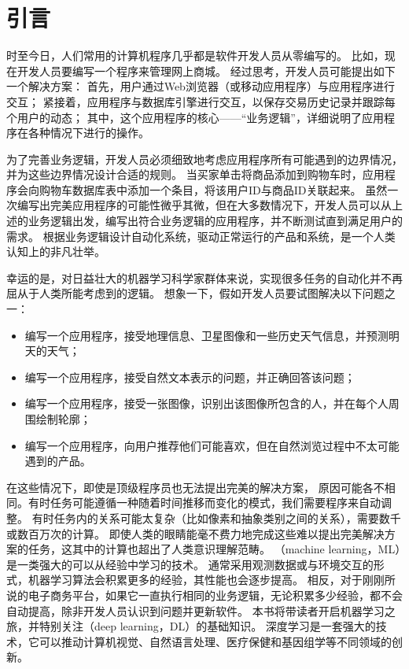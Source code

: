 \documentclass[letterpaper,10pt,english]{sphinxmanual}
\begin{document}
\sphinxstepscope


\chapter{引言}
\label{\detokenize{chapter_introduction/index:chap-introduction}}\label{\detokenize{chapter_introduction/index:id1}}\label{\detokenize{chapter_introduction/index::doc}}
\sphinxAtStartPar
时至今日，人们常用的计算机程序几乎都是软件开发人员从零编写的。
比如，现在开发人员要编写一个程序来管理网上商城。
经过思考，开发人员可能提出如下一个解决方案：
首先，用户通过Web浏览器（或移动应用程序）与应用程序进行交互；
紧接着，应用程序与数据库引擎进行交互，以保存交易历史记录并跟踪每个用户的动态；
其中，这个应用程序的核心——“业务逻辑”，详细说明了应用程序在各种情况下进行的操作。

\sphinxAtStartPar
为了完善业务逻辑，开发人员必须细致地考虑应用程序所有可能遇到的边界情况，并为这些边界情况设计合适的规则。
当买家单击将商品添加到购物车时，应用程序会向购物车数据库表中添加一个条目，将该用户ID与商品ID关联起来。
虽然一次编写出完美应用程序的可能性微乎其微，但在大多数情况下，开发人员可以从上述的业务逻辑出发，编写出符合业务逻辑的应用程序，并不断测试直到满足用户的需求。
根据业务逻辑设计自动化系统，驱动正常运行的产品和系统，是一个人类认知上的非凡壮举。

\sphinxAtStartPar
幸运的是，对日益壮大的机器学习科学家群体来说，实现很多任务的自动化并不再屈从于人类所能考虑到的逻辑。
想象一下，假如开发人员要试图解决以下问题之一：
\begin{itemize}
\item {} 
\sphinxAtStartPar
编写一个应用程序，接受地理信息、卫星图像和一些历史天气信息，并预测明天的天气；

\item {} 
\sphinxAtStartPar
编写一个应用程序，接受自然文本表示的问题，并正确回答该问题；

\item {} 
\sphinxAtStartPar
编写一个应用程序，接受一张图像，识别出该图像所包含的人，并在每个人周围绘制轮廓；

\item {} 
\sphinxAtStartPar
编写一个应用程序，向用户推荐他们可能喜欢，但在自然浏览过程中不太可能遇到的产品。

\end{itemize}

\sphinxAtStartPar
在这些情况下，即使是顶级程序员也无法提出完美的解决方案，
原因可能各不相同。有时任务可能遵循一种随着时间推移而变化的模式，我们需要程序来自动调整。
有时任务内的关系可能太复杂（比如像素和抽象类别之间的关系），需要数千或数百万次的计算。
即使人类的眼睛能毫不费力地完成这些难以提出完美解决方案的任务，这其中的计算也超出了人类意识理解范畴。
（machine learning，ML）是一类强大的可以从经验中学习的技术。
通常采用观测数据或与环境交互的形式，机器学习算法会积累更多的经验，其性能也会逐步提高。
相反，对于刚刚所说的电子商务平台，如果它一直执行相同的业务逻辑，无论积累多少经验，都不会自动提高，除非开发人员认识到问题并更新软件。
本书将带读者开启机器学习之旅，并特别关注（deep
learning，DL）的基础知识。
深度学习是一套强大的技术，它可以推动计算机视觉、自然语言处理、医疗保健和基因组学等不同领域的创新。
\end{document}

